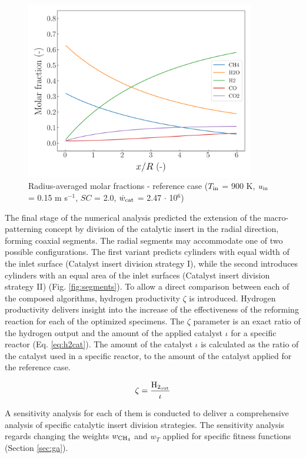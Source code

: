 \documentclass[preprint,12pt]{elsarticle}
\begin{document}
\begin{figure}[h]
\centering
\includegraphics[width=100mm]{ref-avg.png}
\caption{\label{fig:ref-avg} Radius-averaged molar fractions - reference case ($T_{\rm{in}}$ = 900 K, $u_{\rm{in}}$ = 0.15 m s$^{-1}$, $SC$ = 2.0, $\dot{w}_{\rm{cat}}$ = 2.47 $\cdot$ 10$^{6}$)}
\end{figure}

The final stage of the numerical analysis predicted the extension of the macro-patterning concept by division of the catalytic insert in the radial direction, forming coaxial segments. The radial segments may accommodate one of two possible configurations. The first variant predicts cylinders with equal width of the inlet surface (Catalyst insert division strategy I), while the second introduces cylinders with an equal area of the inlet surfaces (Catalyst insert division strategy II) (Fig. \ref{fig:segments}). To allow a direct comparison between each of the composed algorithms, hydrogen productivity $\zeta$ is introduced. Hydrogen productivity delivers insight into the increase of the effectiveness of the reforming reaction for each of the optimized specimens. The $\zeta$ parameter is an exact ratio of the hydrogen output and the amount of the applied catalyst $\iota$  for a specific reactor (Eq. \eqref{eq:h2cat}).  The amount of the catalyst $\iota$ is calculated as the ratio of the catalyst used in a specific reactor, to the amount of the catalyst applied for the reference case.
 
 \begin{equation}
 \label{eq:h2cat}
 \zeta = \frac{\rm{H_{2_{out}}}}{\iota}
  \end{equation}

A sensitivity analysis for each of them is conducted to deliver a comprehensive analysis of specific catalytic insert division strategies. The sensitivity analysis regards changing the weights $w_{\rm{CH_4}}$ and $w_T$ applied for specific fitness functions (Section \ref{sec:ga}).
\end{document}
